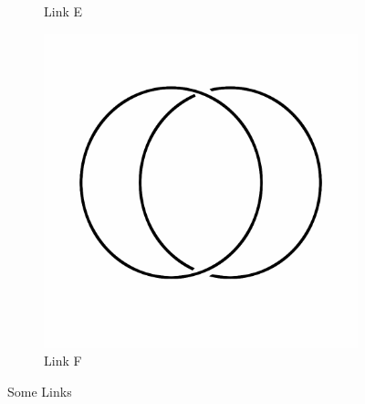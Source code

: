 \documentclass[12pt,letterpaper]{article}
\theoremstyle{definition}
\begin{document}
\begin{figure}[h]
\begin{subfigure}{.3\textwidth}
        \caption{Link E}
    \end{subfigure}
    \quad
    \begin{subfigure}{.3\textwidth}
        \centering
        \includegraphics[width=\textwidth]{meeting11pics/unlink.png}
        \caption{Link F}
    \end{subfigure}
    \caption{Some Links}
\end{figure}
\end{document}
